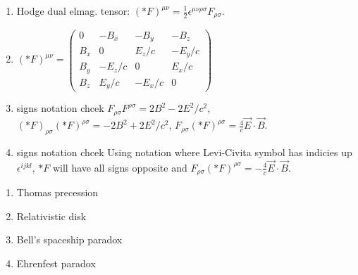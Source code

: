 \documentclass{article}
\begin{document}
\begin{multicols}{3}
\begin{enumerate}
        \item Hodge dual elmag. tensor: $(*F)^{\mu\nu}=\frac{1}{2}\epsilon^{\mu\nu\rho\sigma}F_{\rho\sigma}$.
        \item $(*F)^{\mu\nu}=
            \begin{pmatrix}
                0 & -B_x & -B_y & -B_z\\
                B_x & 0 & E_z/c & -E_y/c\\
                B_y & -E_z/c & 0 & E_x/c\\
                B_z & E_y/c & -E_x/c & 0
            \end{pmatrix}$\\
        \item {\color{red} signs notation chcek} $F_{\rho\sigma}F^{\rho\sigma}=2B^2-2E^2/c^2$, $(*F)_{\rho\sigma}(*F)^{\rho\sigma}=-2B^2+2E^2/c^2$, $F_{\rho\sigma}(*F)^{\rho\sigma}=\frac{4}{c}\vec E\cdot\vec B$.
        \item {\color{red} signs notation chcek} Using notation where Levi-Civita symbol has indicies up $\epsilon^{ijkl}$, $*F$ will have all signs opposite and $F_{\rho\sigma}(*F)^{\rho\sigma}=-\frac{4}{c}\vec E\cdot\vec B$.
    \end{enumerate}



    \begin{enumerate}
        \item Thomas precession
        \item Relativistic disk
        \item Bell's spaceship paradox
        \item Ehrenfest paradox

    \end{enumerate}


\end{multicols}
\end{document}
